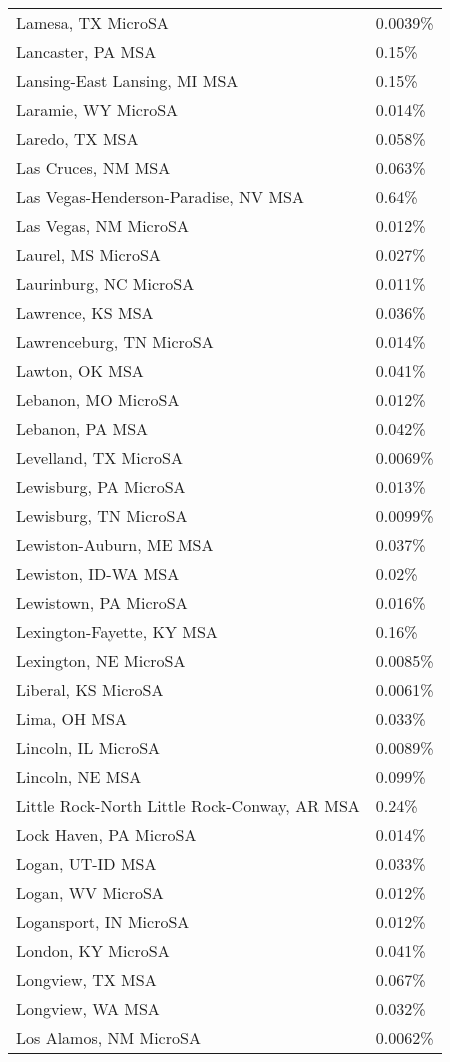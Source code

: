 \begin{longtable}[]{@{}ll@{}}
Lamesa, TX MicroSA & 0.0039\% \\
Lancaster, PA MSA & 0.15\% \\
Lansing-East Lansing, MI MSA & 0.15\% \\
Laramie, WY MicroSA & 0.014\% \\
Laredo, TX MSA & 0.058\% \\
Las Cruces, NM MSA & 0.063\% \\
Las Vegas-Henderson-Paradise, NV MSA & 0.64\% \\
Las Vegas, NM MicroSA & 0.012\% \\
Laurel, MS MicroSA & 0.027\% \\
Laurinburg, NC MicroSA & 0.011\% \\
Lawrence, KS MSA & 0.036\% \\
Lawrenceburg, TN MicroSA & 0.014\% \\
Lawton, OK MSA & 0.041\% \\
Lebanon, MO MicroSA & 0.012\% \\
Lebanon, PA MSA & 0.042\% \\
Levelland, TX MicroSA & 0.0069\% \\
Lewisburg, PA MicroSA & 0.013\% \\
Lewisburg, TN MicroSA & 0.0099\% \\
Lewiston-Auburn, ME MSA & 0.037\% \\
Lewiston, ID-WA MSA & 0.02\% \\
Lewistown, PA MicroSA & 0.016\% \\
Lexington-Fayette, KY MSA & 0.16\% \\
Lexington, NE MicroSA & 0.0085\% \\
Liberal, KS MicroSA & 0.0061\% \\
Lima, OH MSA & 0.033\% \\
Lincoln, IL MicroSA & 0.0089\% \\
Lincoln, NE MSA & 0.099\% \\
Little Rock-North Little Rock-Conway, AR MSA & 0.24\% \\
Lock Haven, PA MicroSA & 0.014\% \\
Logan, UT-ID MSA & 0.033\% \\
Logan, WV MicroSA & 0.012\% \\
Logansport, IN MicroSA & 0.012\% \\
London, KY MicroSA & 0.041\% \\
Longview, TX MSA & 0.067\% \\
Longview, WA MSA & 0.032\% \\
Los Alamos, NM MicroSA & 0.0062\% \\

\end{longtable}
